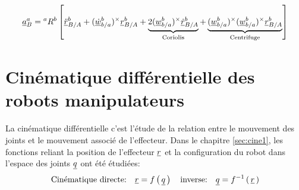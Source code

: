 \begin{align}
	\underline{a}_{B}^{a}
	=
	{}^{a}R^b \left[
		\underline{\ddot{r}}^b_{B/A}
		+
		(\underline{\dot{w}}_{b/a}^b)^{\times} \underline{r}^b_{B/A}
		+
		\underbrace{
			2 (\underline{w}_{b/a}^b)^{\times} \underline{\dot{r}}^b_{B/A}
		}_{\text{Coriolis}}
		+
		\underbrace{
			(\underline{w}_{b/a}^b)^{\times} (\underline{w}_{b/a}^b)^{\times} \underline{r}^b_{B/A}
		}_{\text{Centrifuge}}
		\right]
\end{align}





\newpage
\section{Cinématique différentielle des robots manipulateurs}
\label{sec:differentialkinematicmanipulators}


La cinématique différentielle c'est l'étude de la relation entre le mouvement des joints et le mouvement associé de l'effecteur. Dans le chapitre \ref{sec:cine1}, les fonctions reliant la position de l'effecteur $\underline{r}$ et la configuration du robot dans l'espace des joints $\underline{q}$ ont été étudiées:
\begin{equation}
	\text{Cinématique directe:}  \quad \underline{r} = f\left( \, \underline{q} \, \right)  \quad  \text{inverse:} \quad \underline{q} = f^{-1}\left( \, \underline{r}  \, \right)
\end{equation}

